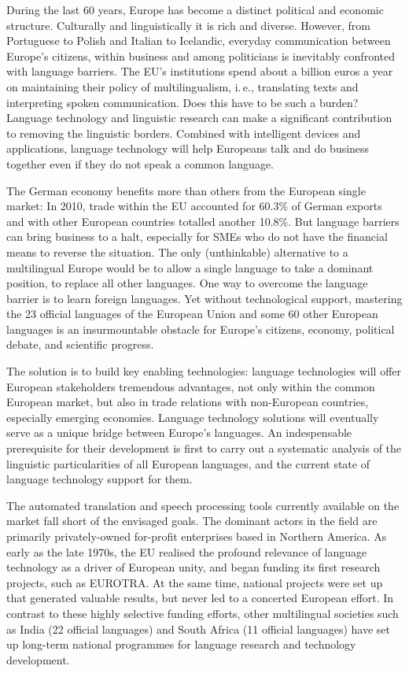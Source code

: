 \documentclass[]{../../metanetpaper}
\begin{document}
\begin{multicols}{2}

During the last 60 years, Europe has become a distinct political and economic structure. Culturally and linguistically it is rich and diverse. However, from Portuguese to Polish and Italian to Icelandic, everyday communication between Europe’s citizens, within business and among politicians is inevitably confronted with language barriers. The EU's institutions spend about a billion euros a year on maintaining their policy of multilingualism, i.\,e., translating texts and interpreting spoken communication. Does this have to be such a burden? Language technology and linguistic research can make a significant contribution to removing the linguistic borders. Combined with intelligent devices and applications, language technology will help Europeans talk and do business together even if they do not speak a common language. 


The German economy benefits more than others from the European single market: In 2010, trade within the EU accounted for 60.3\% of German exports and with other European countries totalled another 10.8\%. But language barriers can bring business to a halt, especially for SMEs who do not have the financial means to reverse the situation. The only (unthinkable) alternative to a multilingual Europe would be to allow a single language to take a dominant position, to replace all other languages. One way to overcome the language barrier is to learn foreign languages. Yet without technological support, mastering the 23 official languages of the European Union and some 60 other European languages is an insurmountable obstacle for Europe’s citizens, economy, political debate, and scientific progress.

The solution is to build key enabling technologies: language technologies will offer European stakeholders tremendous advantages, not only within the common European market, but also in trade relations with non-European countries, especially emerging economies. Language technology solutions will eventually serve as a unique bridge between Europe's languages. An indespensable prerequisite for their development is first to carry out a systematic analysis of the linguistic particularities of all European languages, and the current state of language technology support for them.  
    
The automated translation and speech processing tools currently available on the market fall short of the envisaged goals. The dominant actors in the field are primarily privately-owned for-profit enterprises based in Northern America. As early as the late 1970s, the EU realised the profound relevance of language technology as a driver of European unity, and began funding its first research projects, such as EUROTRA. At the same time, national projects were set up that generated valuable results, but never led to a concerted European effort. In contrast to these highly selective funding efforts, other multilingual societies such as India (22 official languages) and South Africa (11 official languages) have set up long-term national programmes for language research and technology development. 


\end{multicols}
\end{document}
